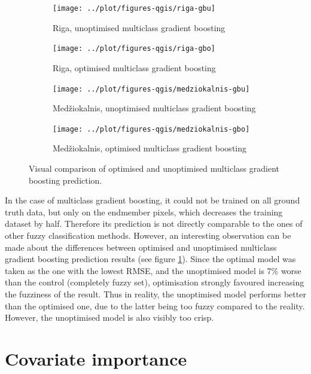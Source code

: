 \documentclass[a4paper,10pt]{book}
\begin{document}
\begin{figure}
  \centering
  \begin{subfigure}[b]{0.48\textwidth}
    \texttt{[image: ../plot/figures-qgis/riga-gbu]}
    \caption{Riga, unoptimised multiclass gradient boosting}
  \end{subfigure} \hfill
  \begin{subfigure}[b]{0.48\textwidth}
    \texttt{[image: ../plot/figures-qgis/riga-gbo]}
    \caption{Riga, optimised multiclass gradient boosting}
  \end{subfigure}
  \begin{subfigure}[b]{0.48\textwidth}
    \texttt{[image: ../plot/figures-qgis/medziokalnis-gbu]}
    \caption{Med\v{z}iokalnis, unoptimised multiclass gradient boosting}
  \end{subfigure} \hfill
  \begin{subfigure}[b]{0.48\textwidth}
    \texttt{[image: ../plot/figures-qgis/medziokalnis-gbo]}
    \caption{Med\v{z}iokalnis, optimised multiclass gradient boosting}
  \end{subfigure}
  \caption{Visual comparison of optimised and unoptimised multiclass gradient boosting prediction.}
  \label{fig-gradientboost-comparison}
\end{figure}

In the case of multiclass gradient boosting, it could not be trained on all ground truth data, but only on the endmember pixels, which decreases the training dataset by half. Therefore its prediction is not directly comparable to the ones of other fuzzy classification methods. However, an interesting observation can be made about the differences between optimised and unoptimised multiclass gradient boosting prediction results (see figure \ref{fig-gradientboost-comparison}). Since the optimal model was taken as the one with the lowest RMSE, and the unoptimised model is 7\% worse than the control (completely fuzzy set), optimisation strongly favoured increasing the fuzziness of the result. Thus in reality, the unoptimised model performs better than the optimised one, due to the latter being too fuzzy compared to the reality. However, the unoptimised model is also visibly too crisp.

\section{Covariate importance}
\end{document}

